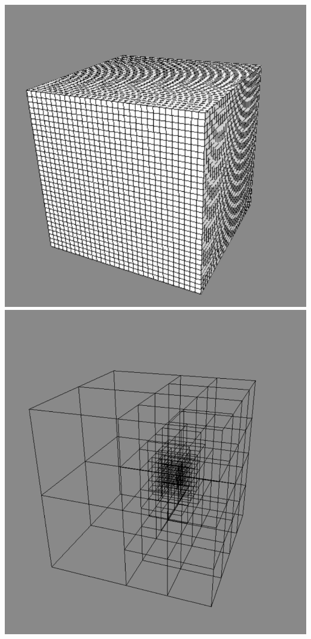 \begin{frame}
\begin{columns}
\begin{column}[b]{0.45\linewidth}
\centering
\includegraphics[scale=0.25]{figures/unifgrid.pdf}\\
\includegraphics[scale=0.16]{figures/adapgrid.pdf}
\end{column}
\end{columns}

\end{frame}


